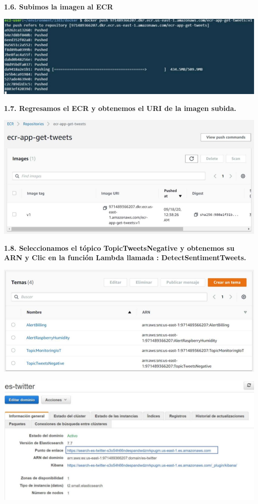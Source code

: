 \documentclass{article}
\begin{document}
	\newpage
\textbf{1.6.   Subimos la imagen al ECR
}

    \begin{center}
		\includegraphics[width=15cm]{./images/6} 
	\end{center}
	
	\newpage
\textbf{1.7. Regresamos el ECR y obtenemos el URI de la imagen subida.
}

    \begin{center}
		\includegraphics[width=15cm]{./images/7} 
	\end{center}
	
	\newpage
\textbf{1.8.  Seleccionamos el tópico TopicTweetsNegative y obtenemos su ARN y Clic en la función Lambda llamada : DetectSentimentTweets.
}

    \begin{center}
		\includegraphics[width=15cm]{./images/8} 
	\end{center}
	
    \begin{center}
		\includegraphics[width=15cm]{./images/9} 
	\end{center}
	
\end{document}
